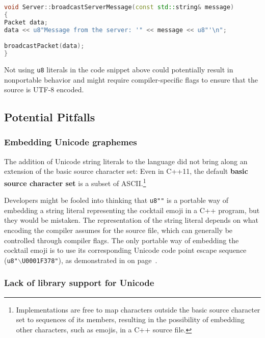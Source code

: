 \begin{lstlisting}[language=C++]
void Server::broadcastServerMessage(const std::string& message)
{
Packet data;
data << u8"Message from the server: '" << message << u8"'\n";

broadcastPacket(data);
}
\end{lstlisting}

\noindent Not using \texttt{u8} literals in the code snippet above could potentially result in
nonportable behavior and might require compiler-specific flags to
ensure that the source is UTF-8 encoded.

\subsection[Potential Pitfalls]{Potential Pitfalls}\label{potential-pitfalls}

\subsubsection[Embedding Unicode graphemes]{Embedding Unicode graphemes}\label{embedding-unicode-graphemes}

The addition of Unicode string literals to the language did not bring
along an extension of the basic source character set: Even in C++11, the
default \textbf{basic source character set} is a subset of
ASCII.{\cprotect\footnote{Implementations are free to map characters
outside the basic source character set to sequences of its members,
resulting in the possibility of embedding other characters, such as emojis, in a C++ source file.}}

Developers might be fooled into thinking that \texttt{u8"\martini"} is a
portable way of embedding a string literal representing the cocktail
emoji in a C++ program, but they would be mistaken. The representation of the string literal depends on what
encoding the compiler assumes for the source file, which can generally
be controlled through compiler flags. The only portable way of embedding
the cocktail emoji is to use its corresponding Unicode code point escape
sequence (\texttt{u8"$\backslash$U0001F378"}), as demonstrated in
\textit{} on page~\pageref{description-unicodestring}.

\subsubsection[Lack of library support for Unicode]{Lack of library support for Unicode}\label{lack-of-library-support-for-unicode}

